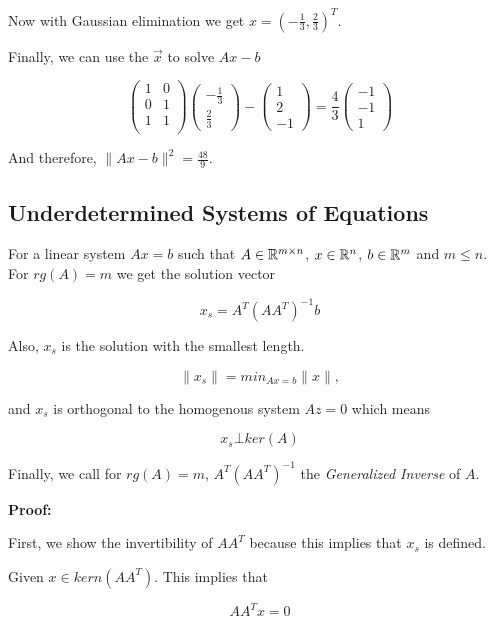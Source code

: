Now with Gaussian elimination we get \(x = (-\frac{1}{3}, \frac{2}{3})^T\). 

Finally, we can use the \(\vec{x}\) to solve \(Ax - b\)

\[
	\begin{pmatrix}
		1 & 0 \\
		0 & 1 \\
		1 & 1 \\
	\end{pmatrix}
	\begin{pmatrix}
		-\frac{1}{3} \\
		\frac{2}{3}
	\end{pmatrix}
	-
	\begin{pmatrix}
		1 \\
		2 \\
		-1
	\end{pmatrix}
	=
	\frac{4}{3}
	\begin{pmatrix}
	-1 \\
	-1 \\
	1
	\end{pmatrix}
\]

And therefore, \(\|Ax - b\|^2 = \frac{48}{9}\).

\subsection{Underdetermined Systems of Equations}

For a linear system \(Ax = b\) such that \(A \in \mathbb{R}^{m \times n}\), \(x\in \mathbb{R}^n\), 
\(b \in \mathbb{R}^m\) and \(m \le n\). For \(rg(A) = m\) we get the solution vector

\[
	x_s = A^T {(A A^T)}^{-1} b
\]

Also, \(x_s\) is the solution with the smallest length. 

\[
	\|x_s\| = min_{Ax = b} \|x\|,
\] 

and \(x_s\) is orthogonal to the homogenous system \(Az = 0\) which means

\[
	x_s \bot ker(A)
\]

Finally, we call for  \(rg(A) = m\), \(A^T {(A A^T)}^{-1}\) the \emph{Generalized Inverse} of \(A\).

\textbf{Proof:}

First, we show the invertibility of \(AA^T\) because this implies that \(x_s\) is defined.

Given \(x \in kern(AA^T)\). This implies that 

\[
	AA^T x = 0	
\] 

